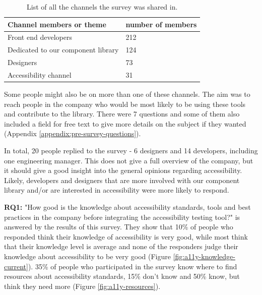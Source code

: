 \documentclass{master_thesis}
\begin{document}
\begin{table}[H]
	\centering
	\begin{tabular}{|l|l|}
		\hline
		\textbf{Channel members or theme} & \textbf{number of members}  \\
		\hline
		Front end developers  & 212  \\
		\hline
		Dedicated to our component library  & 124  \\
		\hline
		Designers  & 73  \\
		\hline
		Accessibility channel  & 31  \\
		\hline
	\end{tabular}
	\caption{List of all the channels the survey was shared in.}
	\label{table:survey-shared}
\end{table}

Some people might also be on more than one of these channels. The aim was to reach people in the company who would be most likely to be using these tools and contribute to the library. There were 7 questions and some of them also included a field for free text to give more details on the subject if they wanted (Appendix \ref{appendix:pre-survey-questions}).

In total, 20 people replied to the survey - 6 designers and 14 developers, including one engineering manager. This does not give a full overview of the company, but it should give a good insight into the general opinions regarding accessibility. Likely, developers and designers that are more involved with our component library and/or are interested in accessibility were more likely to respond.

\textbf{RQ1:} "How good is the knowledge about accessibility standards, tools and best practices in the company before integrating the accessibility testing tool?" is answered by the results of this survey. They show that 10\% of people who responded think their knowledge of accessibility is very good, while most think that their knowledge level is average and none of the responders judge their knowledge about accessibility to be very good (Figure \ref{fig:a11y-knowledge-current}). 35\% of people who participated in the survey know where to find resources about accessibility standards, 15\% don't know and 50\% know, but think they need more (Figure \ref{fig:a11y-resources}).
\end{document}
